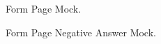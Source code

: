 \begin{figure}[H]
	\begin{center}
	\end{center}
	\caption{Form Page Mock.}\label{fig:form}
\end{figure}

\begin{figure}[H]
	\begin{center}
	\end{center}
	\caption{Form Page Negative Answer Mock.}\label{fig:form_no}
\end{figure}

